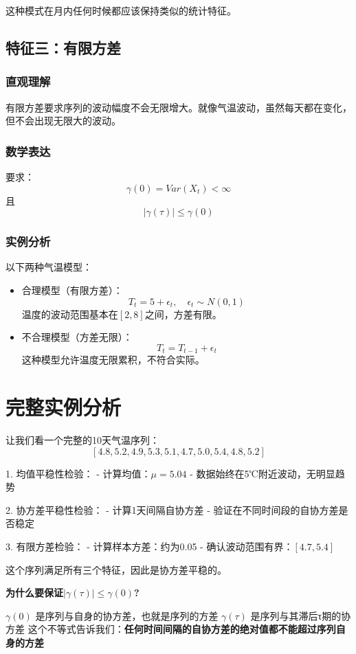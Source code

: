 这种模式在月内任何时候都应该保持类似的统计特征。

\subsection{特征三：有限方差}
\subsubsection{直观理解}
有限方差要求序列的波动幅度不会无限增大。就像气温波动，虽然每天都在变化，但不会出现无限大的波动。

\subsubsection{数学表达}
要求：
$$\gamma(0) = Var(X_t) < \infty$$
且
$$|\gamma(\tau)| \leq \gamma(0)$$

\subsubsection{实例分析}
以下两种气温模型：
\begin{itemize}
    \item 合理模型（有限方差）：
    $$T_t = 5 + \epsilon_t, \quad \epsilon_t \sim N(0,1)$$
    温度的波动范围基本在$[2,8]$之间，方差有限。
    
    \item 不合理模型（方差无限）：
    $$T_t = T_{t-1} + \epsilon_t$$
    这种模型允许温度无限累积，不符合实际。
\end{itemize}

\section{完整实例分析}
让我们看一个完整的10天气温序列：
$$[4.8, 5.2, 4.9, 5.3, 5.1, 4.7, 5.0, 5.4, 4.8, 5.2]$$

1. 均值平稳性检验：
   - 计算均值：$\mu = 5.04$
   - 数据始终在5℃附近波动，无明显趋势

2. 协方差平稳性检验：
   - 计算1天间隔自协方差
   - 验证在不同时间段的自协方差是否稳定

3. 有限方差检验：
   - 计算样本方差：约为0.05
   - 确认波动范围有界：$[4.7, 5.4]$

这个序列满足所有三个特征，因此是协方差平稳的。



\textbf{为什么要保证$|\gamma(\tau)| \leq \gamma(0)$?}

$\gamma(0)$ 是序列与自身的协方差，也就是序列的方差
$\gamma(\tau)$ 是序列与其滞后τ期的协方差
这个不等式告诉我们：\textbf{任何时间间隔的自协方差的绝对值都不能超过序列自身的方差}

